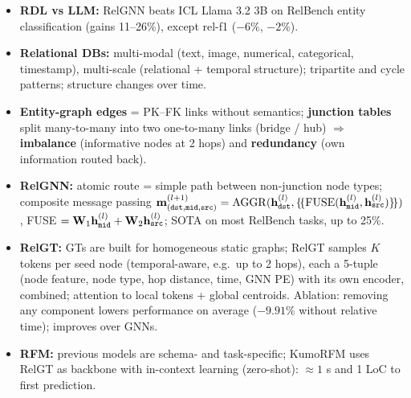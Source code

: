 \bigskip{}
{}
\begin{summarybox}
  \begin{itemize}
    \item \textbf{RDL vs LLM:} RelGNN beats ICL Llama 3.2 3B on RelBench entity
      classification (gains 11--26\%), except rel-f1 ($-6$\%, $-2$\%).
    \item \textbf{Relational DBs:} multi-modal (text, image, numerical, categorical,
      timestamp), multi-scale (relational + temporal structure); tripartite and cycle
      patterns; structure changes over time.
    \item \textbf{Entity-graph edges} = PK--FK links without semantics; \textbf{junction
      tables} split many-to-many into two one-to-many links (bridge / hub) $\Rightarrow$
      \textbf{imbalance} (informative nodes at 2 hops) and \textbf{redundancy} (own
      information routed back).
    \item \textbf{RelGNN:} atomic route = simple path between non-junction node types;
      composite message passing
      $\mathbf{m}^{(l+1)}_{(\mathtt{dst},\mathtt{mid},\mathtt{src})}
      =\mathrm{AGGR}(\mathbf{h}^{(l)}_{\mathtt{dst}},\{\!\{\mathrm{FUSE}(\mathbf{h}^{(l)}_{\mathtt{mid}},
      \mathbf{h}^{(l)}_{\mathtt{src}})\}\!\})$, FUSE
      $=\mathbf{W}_1\mathbf{h}^{(l)}_{\mathtt{mid}}+\mathbf{W}_2\mathbf{h}^{(l)}_{\mathtt{src}}$;
      SOTA on most RelBench tasks, up to 25\%.
    \item \textbf{RelGT:} GTs are built for homogeneous static graphs; RelGT samples
      $K$ tokens per seed node (temporal-aware, e.g.\ up to 2 hops), each a 5-tuple (node
      feature, node type, hop distance, time, GNN PE) with its own encoder, combined;
      attention to local tokens + global centroids. Ablation: removing any component
      lowers performance on average ($-9.91$\% without relative time); improves over
      GNNs.
    \item \textbf{RFM:} previous models are schema- and task-specific; KumoRFM uses RelGT
      as backbone with in-context learning (zero-shot): $\approx1$ s and 1 LoC to first
      prediction.
  \end{itemize}
\end{summarybox}
